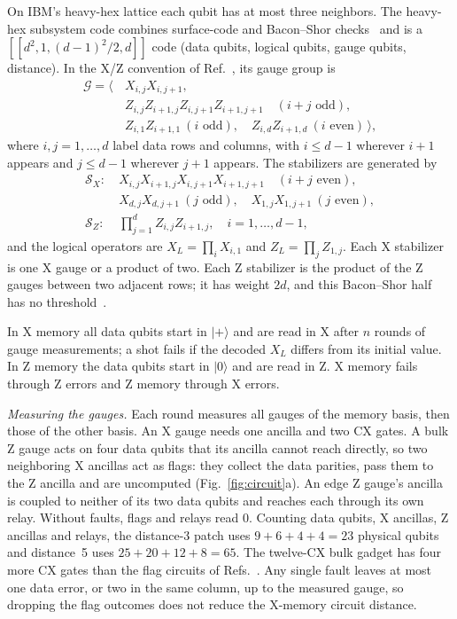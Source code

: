 \documentclass[aps,pra,reprint,nofootinbib,longbibliography,floatfix]{revtex4-2}
\newcommand{\ket}[1]{\lvert #1\rangle}
\begin{document}
On IBM's heavy-hex lattice each qubit has at most three neighbors.
The heavy-hex subsystem code combines surface-code and Bacon--Shor checks~\cite{chamberland2020topological,bacon2006operator} and is a $[[d^2,1,(d-1)^2/2,d]]$ code (data qubits, logical qubits, gauge qubits, distance).
In the X/Z convention of Ref.~\cite{sundaresan2023demonstrating}, its gauge group is
\begin{align}
\mathcal{G} = \big\langle\, & X_{i,j}X_{i,j+1},\nonumber\\
& Z_{i,j}Z_{i+1,j}Z_{i,j+1}Z_{i+1,j+1} \quad (i+j \text{ odd}), \label{eq:gauges}\\
& Z_{i,1}Z_{i+1,1}\ (i \text{ odd}),\quad Z_{i,d}Z_{i+1,d}\ (i \text{ even}) \,\big\rangle ,\nonumber
\end{align}
where $i,j=1,\dots,d$ label data rows and columns, with $i\le d-1$ wherever $i+1$ appears and $j\le d-1$ wherever $j+1$ appears.
The stabilizers are generated by
\begin{align}
\mathcal{S}_X:\ & X_{i,j}X_{i+1,j}X_{i,j+1}X_{i+1,j+1}\quad (i+j \text{ even}),\nonumber\\
& X_{d,j}X_{d,j+1}\ (j \text{ odd}),\quad X_{1,j}X_{1,j+1}\ (j \text{ even}), \label{eq:stabilizers}\\
\mathcal{S}_Z:\ & \textstyle\prod_{j=1}^{d} Z_{i,j}Z_{i+1,j},\quad i=1,\dots,d-1,\nonumber
\end{align}
and the logical operators are $X_L=\prod_i X_{i,1}$ and $Z_L=\prod_j Z_{1,j}$.
Each X stabilizer is one X gauge or a product of two.
Each Z stabilizer is the product of the Z gauges between two adjacent rows; it has weight $2d$, and this Bacon--Shor half has no threshold~\cite{chamberland2020topological,napp2013optimal}.

In X memory all data qubits start in $\ket{+}$ and are read in X after $n$ rounds of gauge measurements; a shot fails if the decoded $X_L$ differs from its initial value.
In Z memory the data qubits start in $\ket{0}$ and are read in Z.
X memory fails through Z errors and Z memory through X errors.

\textit{Measuring the gauges.}
Each round measures all gauges of the memory basis, then those of the other basis.
An X gauge needs one ancilla and two CX gates.
A bulk Z gauge acts on four data qubits that its ancilla cannot reach directly, so two neighboring X ancillas act as flags: they collect the data parities, pass them to the Z ancilla and are uncomputed (Fig.~\ref{fig:circuit}a).
An edge Z gauge's ancilla is coupled to neither of its two data qubits and reaches each through its own relay.
Without faults, flags and relays read 0.
Counting data qubits, X ancillas, Z ancillas and relays, the distance-3 patch uses $9+6+4+4=23$ physical qubits and distance~5 uses $25+20+12+8=65$.
The twelve-CX bulk gadget has four more CX gates than the flag circuits of Refs.~\cite{chamberland2020topological,sundaresan2023demonstrating}.
Any single fault leaves at most one data error, or two in the same column, up to the measured gauge, so dropping the flag outcomes does not reduce the X-memory circuit distance.
\end{document}
